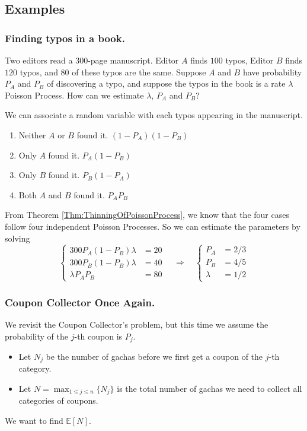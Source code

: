     \subsection{Examples}
        \subsubsection{Finding typos in a book.} Two editors read a 300-page manuscript. Editor $A$ finds $100$ typos, Editor $B$ finds $120$ typos, and $80$ of these typos are the same. Suppose $A$ and $B$ have probability $P_A$ and $P_B$ of discovering a typo, and suppose the typos in the book is a rate $\lambda$ Poisson Process. How can we estimate $\lambda$, $P_A$ and $P_B$?
    
        We can associate a random variable with each typos appearing in the manuscript.
        \begin{enumerate}
            \item Neither $A$ or $B$ found it. $(1-P_A)(1-P_B)$
            \item Only $A$ found it. $P_A(1-P_B)$
            \item Only $B$ found it. $P_B(1-P_A)$
            \item Both $A$ and $B$ found it. $P_AP_B$
        \end{enumerate}
        From Theorem \ref{Thm:ThinningOfPoissonProcess}, we know that the four cases follow four independent Poisson Processes. So we can estimate the parameters by solving
        \[
        \begin{cases}
            300P_A(1-P_B)\lambda &= 20\\
            300P_B(1-P_B)\lambda &= 40\\
            \lambda P_AP_B &= 80
        \end{cases}
        \quad \Longrightarrow \quad
        \begin{cases}
            P_A &= 2/3\\
            P_B &= 4/5\\
            \lambda &= 1/2
        \end{cases}
        \]
    
        \subsubsection{Coupon Collector Once Again.}
        We revisit the Coupon Collector's problem, but this time we assume the probability of the $j$-th coupon is $P_j$.
        \begin{itemize}
            \item Let $N_j$ be the number of gachas before we first get a coupon of the $j$-th category.
            \item Let $N = \max_{1 \le j \le n}\{N_j\}$ is the total number of gachas we need to collect all categories of coupons.
        \end{itemize}
        We want to find $\mathbb{E}[N]$.

